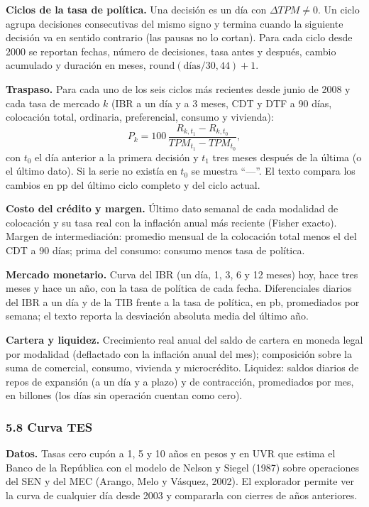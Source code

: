 \textbf{Ciclos de la tasa de política.} Una decisión es un día con
\(\Delta TPM\neq 0\). Un ciclo agrupa decisiones consecutivas del mismo
signo y termina cuando la siguiente decisión va en sentido contrario
(las pausas no lo cortan). Para cada ciclo desde 2000 se reportan
fechas, número de decisiones, tasa antes y después, cambio acumulado y
duración en meses, \(\text{round}(\text{días}/30{,}44)+1\).

\textbf{Traspaso.} Para cada uno de los seis ciclos más recientes desde
junio de 2008 y cada tasa de mercado \(k\) (IBR a un día y a 3 meses,
CDT y DTF a 90 días, colocación total, ordinaria, preferencial, consumo
y vivienda):
\[P_k = 100\,\frac{R_{k,t_1}-R_{k,t_0}}{TPM_{t_1}-TPM_{t_0}},\] con
\(t_0\) el día anterior a la primera decisión y \(t_1\) tres meses
después de la última (o el último dato). Si la serie no existía en
\(t_0\) se muestra ``---''. El texto compara los cambios en pp del
último ciclo completo y del ciclo actual.

\textbf{Costo del crédito y margen.} Último dato semanal de cada
modalidad de colocación y su tasa real con la inflación anual más
reciente (Fisher exacto). Margen de intermediación: promedio mensual de
la colocación total menos el del CDT a 90 días; prima del consumo:
consumo menos tasa de política.

\textbf{Mercado monetario.} Curva del IBR (un día, 1, 3, 6 y 12 meses)
hoy, hace tres meses y hace un año, con la tasa de política de cada
fecha. Diferenciales diarios del IBR a un día y de la TIB frente a la
tasa de política, en pb, promediados por semana; el texto reporta la
desviación absoluta media del último año.

\textbf{Cartera y liquidez.} Crecimiento real anual del saldo de cartera
en moneda legal por modalidad (deflactado con la inflación anual del
mes); composición sobre la suma de comercial, consumo, vivienda y
microcrédito. Liquidez: saldos diarios de repos de expansión (a un día y
a plazo) y de contracción, promediados por mes, en billones (los días
sin operación cuentan como cero).

\hypertarget{curva-tes}{%
\subsubsection{5.8 Curva TES}\label{curva-tes}}

\textbf{Datos.} Tasas cero cupón a 1, 5 y 10 años en pesos y en UVR que
estima el Banco de la República con el modelo de Nelson y Siegel (1987)
sobre operaciones del SEN y del MEC (Arango, Melo y Vásquez, 2002). El
explorador permite ver la curva de cualquier día desde 2003 y compararla
con cierres de años anteriores.

